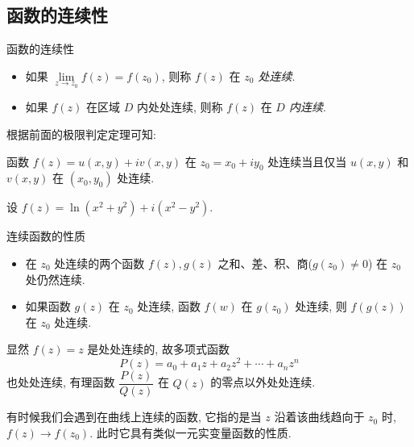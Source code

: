 \subsection{函数的连续性}
\begin{frame}{函数的连续性}
	\onslide<+->
	\begin{definition}
		\begin{itemize}
			\item 如果 $\lim\limits_{z\to z_0}f(z)=f(z_0)$, 则称 $f(z)$ 在 \emph{$z_0$ 处连续}.
			\item 如果 $f(z)$ 在区域 $D$ 内处处连续, 则称 $f(z)$ 在 \emph{$D$ 内连续}.
		\end{itemize}
	\end{definition}

	\onslide<+->
	根据前面的极限判定定理可知:
	\onslide<+->
	\begin{theorem}
		函数 $f(z)=u(x,y)+iv(x,y)$ 在 $z_0=x_0+iy_0$ 处连续当且仅当 $u(x,y)$ 和 $v(x,y)$ 在 $(x_0,y_0)$ 处连续.
	\end{theorem}

	\onslide<+->
	\begin{example}
		设 $f(z)=\ln(x^2+y^2)+i(x^2-y^2)$.
		\onslide<+->{因此 $f(z)$ 在 $z\neq0$ 处连续.}
	\end{example}
\end{frame}


\begin{frame}{连续函数的性质}
	\onslide<+->
	\begin{theorem}
		\begin{itemize}
			\item 在 $z_0$ 处连续的两个函数 $f(z),g(z)$ 之和、差、积、商($g(z_0)\neq 0$) 在 $z_0$ 处仍然连续.
			\item 如果函数 $g(z)$ 在 $z_0$ 处连续, 函数 $f(w)$ 在 $g(z_0)$ 处连续, 则 $f(g(z))$ 在 $z_0$ 处连续.
		\end{itemize}
	\end{theorem}

	\onslide<+->
	显然 $f(z)=z$ 是处处连续的,
	\onslide<+->
	故多项式函数
	\[P(z)=a_0+a_1z+a_2z^2+\cdots+a_nz^n\]
	也处处连续,
	\onslide<+->
	有理函数 $\dfrac{P(z)}{Q(z)}$ 在 $Q(z)$ 的零点以外处处连续.

	\onslide<+->
	有时候我们会遇到在曲线上连续的函数, 它指的是当 $z$ 沿着该曲线趋向于 $z_0$ 时, $f(z)\to f(z_0)$.
	\onslide<+->
	此时它具有类似一元实变量函数的性质.
\end{frame}


